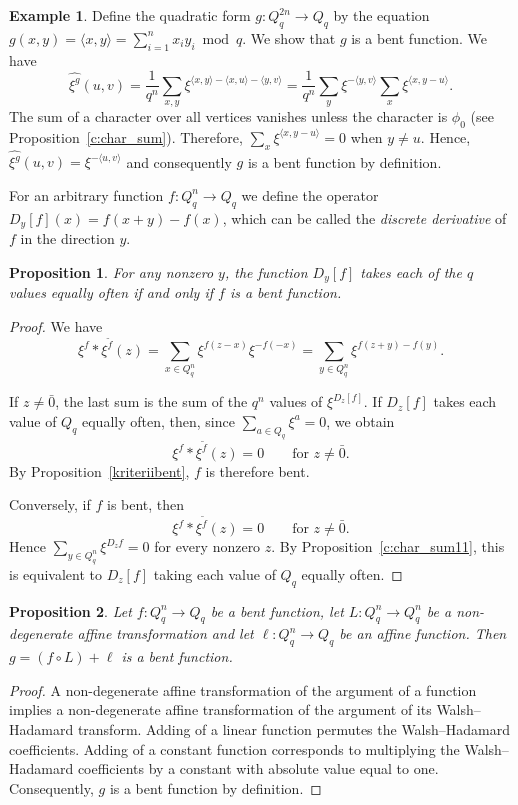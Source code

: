 \documentclass[11pt]{article}
\newtheorem{claim}{Proposition}[section]
\theoremstyle{definition}
\newtheorem{example}{Example}[section]
\begin{document}
{{{\begin{example}\label{ex:quadbent}
 Define the quadratic form
$g:Q^{2n}_q\rightarrow Q_q$ by the equation $g(x,y)=\langle x,y\rangle=
\sum\limits_{i=1}^nx_iy_i \bmod q$. We show that $g$ is a
bent function. We have
$$\widehat{\xi^g}(u,v)=\frac{1}{q^n}\sum\limits_{x,y}\xi^{\langle x,y\rangle - \langle x, u\rangle -
\langle y, v\rangle}=\frac{1}{q^n}\sum\limits_{y}\xi^{-\langle y,
v\rangle}\sum\limits_{x}\xi^{\langle x,y-u\rangle }.$$ The sum
of a character over all vertices  vanishes unless  the
character is $\phi_0$ (see Proposition~\ref{c:char_sum}). Therefore,
$\sum\limits_{x}\xi^{\langle x,y-u\rangle}=0$ when $y\neq u$. Hence,
$\widehat{\xi^g}(u,v)=\xi^{-\langle u, v\rangle}$ and consequently $g$ is a
bent function by definition.
\end{example}




For an arbitrary function $f:Q^n_q\rightarrow Q_q$ we define the operator
$D_y[f](x)=f(x+y)-f(x)$, which can be called the {\sl discrete
derivative} of $f$ in the direction $y$.

\begin{claim}\label{cl:diff}
For any nonzero $y$, the function $D_y[f]$  takes each of the $q$
values equally often  if and only if $f$ is a
bent function.
\end{claim}
\begin{proof}
We have 
$$\xi^f *\xi^{\widetilde{f}}(z)=\sum\limits_{x\in
Q^n_q}\xi^{f(z-x)}\xi^{-f(-x)}=\sum\limits_{y\in
Q^n_q}\xi^{f(z+y)-f(y)}.$$

If $z\ne\bar 0$, the last sum is the sum of the $q^n$ values of
$\xi^{D_z[f]}$. If $D_z[f]$ takes each value of $Q_q$ equally often, then, since
$\sum_{a\in Q_q}\xi^a=0$,
we obtain
\[
\xi^f*\xi^{\widetilde f}(z)=0
\qquad\text{for }z\ne\bar 0.
\]
By Proposition~\ref{kriteriibent}, $f$ is therefore bent.

Conversely, if $f$ is bent, then
\[
\xi^f*\xi^{\widetilde f}(z)=0
\qquad\text{for }z\ne\bar 0.
\]
Hence
$\sum_{y\in Q_q^n}\xi^{D_zf}=0$
for every nonzero $z$. By Proposition~\ref{c:char_sum11}, this is equivalent to $D_z[f]$ taking each value of $Q_q$ equally often.
\end{proof}


\begin{claim}\label{splat12}
Let $f:Q_q^n\rightarrow Q_q$ be a  bent function, let
$L:Q_q^n\rightarrow Q_q^n$ be a non-degenerate affine transformation
and let $\ell: Q_q^n\rightarrow Q_q$ be an affine function. Then
$g=(f\circ L)+\ell$ is a bent function.
\end{claim}
\begin{proof}
A non-degenerate affine transformation of the argument of a function  implies a non-degenerate affine transformation of  the argument of its Walsh--Hadamard transform. Adding of a linear function permutes the Walsh--Hadamard coefficients. Adding of a constant function corresponds to multiplying the Walsh--Hadamard coefficients by a constant with absolute value  equal to one. Consequently, $g$ is a bent function by definition.
\end{proof}


}}}
\end{document}
